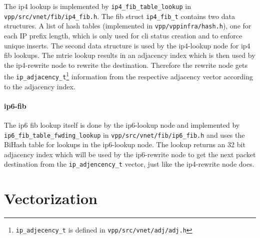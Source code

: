 



The \Ac{ip4} lookup is implemented by \lstinline|ip4_fib_table_lookup|
in \lstinline|vpp/src/vnet/fib/ip4_fib.h|. The \Ac{fib} struct
\lstinline|ip4_fib_t| contains two data structures. A list of hash
tables (implemented in \lstinline|vpp/vppinfra/hash.h|), one for each
IP prefix length, which is only used for \Ac{cli} status creation and
to enforce unique inserts. The second data structure is used by the
ip4-lookup node for \Ac{ip4} \Ac{fib} lookups. The mtrie lookup
results in an adjacency index which is then used by the ip4-rewrite
node to rewrite the destination. Therefore the rewrite node gets the
\lstinline|ip_adjacency_t|\footnote{\lstinline|ip_adjecency_t| is
defined in \lstinline|vpp/src/vnet/adj/adj.h|} information from the
respective adjacency vector according to the adjacency index.


\paragraph{\Ac{ip6}-fib}

The \Ac{ip6} \Ac{fib} lookup itself is done by the ip6-lookup node and
implemented by \lstinline|ip6_fib_table_fwding_lookup| in
\lstinline|vpp/src/vnet/fib/ip6_fib.h| and uses the BiHash table for
lookups in the ip6-lookup node. The lookup returns an 32 bit adjacency
index which will be used by the ip6-rewrite node to get the next
packet destination from the \lstinline|ip_adjencency_t| vector, just
like the ip4-rewrite node does.



\section{Vectorization}
\label{sec:vectorization}


